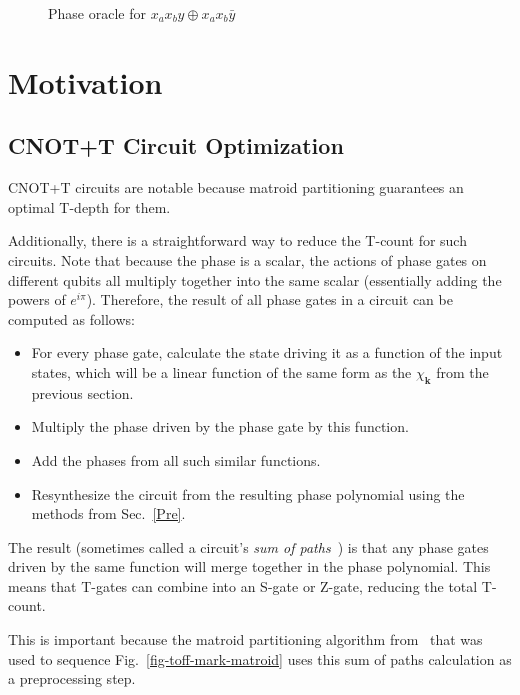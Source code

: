\begin{figure*}[t]
  \scalebox{1.0} {
    
  }
  \scalebox{1.0} {
    
  }
  \caption{Phase oracle for $x_a x_b y \oplus x_a x_b \bar{y}$}
  \label{fig-series-all}
\end{figure*}

\section{Motivation}
\label{Mot}
\subsection{CNOT+T Circuit Optimization}
\label{Mot:CnotOpt}
CNOT+T circuits are notable because matroid partitioning guarantees an optimal T-depth
for them.

Additionally, there is a straightforward way to reduce the T-count for such circuits.
Note that because the phase is a scalar, the actions of phase gates on different
qubits all multiply together into the same scalar (essentially adding the powers
of $e^{i \pi}$). Therefore, the result of all phase gates in a circuit
can be computed as follows:

\begin{itemize}
\item For every phase gate, calculate the state driving it as a function of the
  input states, which will be a linear function of the same form as the
  $\chi_{\mathbf{k}}$ from the previous section.
\item Multiply the phase driven by the phase gate by this function.
\item Add the phases from all such similar functions.
\item Resynthesize the circuit from the resulting phase polynomial using
  the methods from Sec.~\ref{Pre}.
\end{itemize}

The result (sometimes called a circuit's {\it sum of paths}~\cite{bib-amy-cnot})
is that any phase gates driven by the same function will merge
together in the phase polynomial. This means that T-gates
can combine into an S-gate or Z-gate, reducing the total T-count.

This is important because the matroid partitioning algorithm from~\cite{bib-amy-matroid}
that was used to sequence Fig.~\ref{fig-toff-mark-matroid} uses this sum of paths
calculation as a preprocessing step. 

